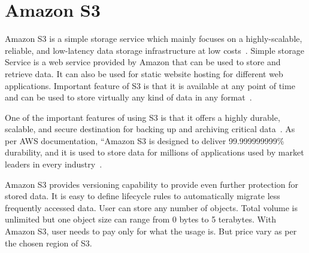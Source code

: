 \section{Amazon S3}

Amazon S3 is a simple storage service which mainly focuses on a highly-scalable,
reliable, and low-latency data storage infrastructure at low
costs~\cite{hid-sp18-420-amazon-S3-FAQ}. Simple storage Service is a web service
provided by Amazon that can be used to store and retrieve data. It can also be
used for static website hosting for different web applications. Important
feature of S3 is that it is available at any point of time and can be used to
store virtually any kind of data in any
format~\cite{hid-sp18-420-amazon-S3-FAQ}.

One of the important features of using S3 is that it offers a highly durable,
scalable, and secure destination for backing up and archiving critical
data~\cite{hid-sp18-420-amazon-S3}. As per AWS documentation, ``Amazon S3 is
designed to deliver 99.999999999\% durability, and it is used to store data for
millions of applications used by market leaders in every
industry~\cite{hid-sp18-420-amazon-S3}.

Amazon S3 provides versioning capability to provide even further protection for
stored data. It is easy to define lifecycle rules to automatically migrate less
frequently accessed data. User can store any number of objects. Total volume is
unlimited but one object size can range from 0 bytes to 5 terabytes. With Amazon
S3, user needs to pay only for what the usage is. But price vary as per the
chosen region of S3.
